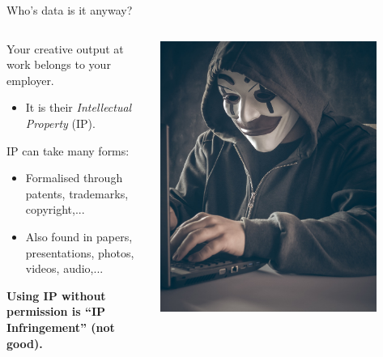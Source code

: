 \begin{frame}{Who's data is it anyway?}

\begin{columns}[c]
    \begin{column}{0.45\textwidth}

    \begin{minipage}[t][.7\textheight]{\textwidth}

    Your creative output at work belongs to your employer.
    \begin{itemize}
    \item It is their \emph{Intellectual Property} (IP).
    \end{itemize}
    
    \vfill
    
    IP can take many forms:
    \begin{itemize}
        \item Formalised through patents, trademarks, copyright,...
        \item Also found in papers, presentations, photos, videos, audio,...
    \end{itemize}
    
    \vfill
    
    \textbf{Using IP without permission is ``IP Infringement'' (not good).}
    \end{minipage}%
    
    \end{column}

    \begin{column}{0.45\textwidth}
        \includegraphics[width=0.85\textwidth]{images/bermix-studio-F7DAQIDSk98-unsplash.jpg}
    \end{column}


\end{columns}
\end{frame}
